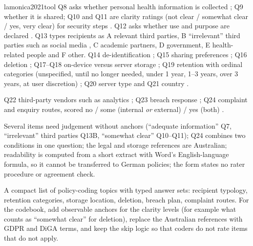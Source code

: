 \begin{papercard}{lamonica2021tool}
 Q8 asks whether personal health information is collected ; Q9 whether it is shared; Q10 and Q11 are clarity ratings (not clear / somewhat clear / yes, very clear) for security steps . Q12 asks whether use and purpose are declared . Q13 types recipients as A relevant third parties, B ``irrelevant'' third parties such as social media , C academic partners, D government, E health-related people and F other. Q14 de-identification ; Q15 sharing preferences ; Q16 deletion ; Q17--Q18 on-device versus server storage ; Q19 retention with ordinal categories (unspecified, until no longer needed, under 1 year, 1--3 years, over 3 years, at user discretion) ; Q20 server type and Q21 country .

 Q22 third-party vendors such as analytics ; Q23 breach response ; Q24 complaint and enquiry routes, scored no / some (internal \emph{or} external) / yes (both) .

 Several items need judgement without anchors (``adequate information'' Q7, ``irrelevant'' third parties Q13B, ``somewhat clear'' Q10--Q11); Q24 combines two conditions in one question; the legal and storage references are Australian; readability is computed from a short extract with Word's English-language formula, so it cannot be transferred to German policies; the form states no rater procedure or agreement check.

 A compact list of policy-coding topics with typed answer sets: recipient typology, retention categories, storage location, deletion, breach plan, complaint routes. For the codebook, add observable anchors for the clarity levels (for example what counts as ``somewhat clear'' for deletion), replace the Australian references with GDPR and DiGA terms, and keep the skip logic so that coders do not rate items that do not apply.
\end{papercard}
